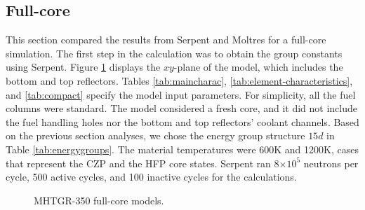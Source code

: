 \subsection{Full-core}

This section compared the results from Serpent and Moltres for a full-core simulation.
The first step in the calculation was to obtain the group constants using Serpent.
Figure \ref{fig:fullcoremodel} displays the $xy$-plane of the model, which includes the bottom and top reflectors.
Tables \ref{tab:maincharac}, \ref{tab:element-characteristics}, and \ref{tab:compact} specify the model input parameters.
For simplicity, all the fuel columns were standard.
The model considered a fresh core, and it did not include the fuel handling holes nor the bottom and top reflectors' coolant channels.
Based on the previous section analyses, we chose the energy group structure $15d$ in Table \ref{tab:energygroups}.
The material temperatures were 600K and 1200K, cases that represent the \gls{CZP} and the \gls{HFP} core states.
Serpent ran 8$\times 10^5$ neutrons per cycle, 500 active cycles, and 100 inactive cycles for the calculations.

\begin{figure}[htbp!]
	\centering
	\hfill
  \caption{MHTGR-350 full-core models.}
	\label{fig:fullcoremodel}
\end{figure}

